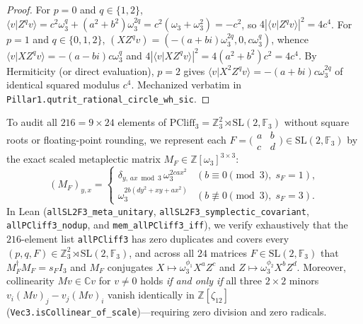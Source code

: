 \documentclass[11pt,letterpaper]{article}
\theoremstyle{plain}
\theoremstyle{definition}
\theoremstyle{remark}
\newcommand{\F}{\mathbb{F}}
\newcommand{\Z}{\mathbb{Z}}
\newcommand{\C}{\mathbb{C}}
\newcommand{\PCliff}{\mathrm{PCliff}}
\newcommand{\SL}{\mathrm{SL}}
\newcommand{\braket}[2]{\langle #1 \vert #2 \rangle}
\newcommand{\leanref}[1]{\textnormal{\texttt{\footnotesize #1}}}
\begin{document}
\begin{proof}
For $p=0$ and $q\in\{1,2\}$, $\braket{v}{Z^q v}=c^2\omega_3^q+(a^2+b^2)\omega_3^{2q}=c^2(\omega_3+\omega_3^2)=-c^2$, so $4|\braket{v}{Z^q v}|^2=4c^4$. For $p=1$ and $q\in\{0,1,2\}$, $(X Z^q v)=(-(a+bi)\omega_3^{2q},0,c\omega_3^q)$, whence $\braket{v}{X Z^q v}=-(a-bi)c\omega_3^q$ and $4|\braket{v}{X Z^q v}|^2=4(a^2+b^2)c^2=4c^4$. By Hermiticity (or direct evaluation), $p=2$ gives $\braket{v}{X^2 Z^q v}=-(a+bi)c\omega_3^{2q}$ of identical squared modulus $c^4$. Mechanized verbatim in \leanref{Pillar1.qutrit\_rational\_circle\_wh\_sic}.
\end{proof}

To audit all $216=9\times 24$ elements of $\PCliff_3=\Z_3^2\rtimes\SL(2,\F_3)$ without square roots or floating-point rounding, we represent each $F=\bigl(\begin{smallmatrix}a & b\\ c & d\end{smallmatrix}\bigr)\in\SL(2,\F_3)$ by the exact scaled metaplectic matrix $M_F\in\Z[\omega_3]^{3\times 3}$:
\begin{equation}
\label{eq:meta-entry}
  (M_F)_{y,x} =
  \begin{cases}
    \delta_{y,\,ax\bmod 3}\,\omega_3^{2cax^2} & (b\equiv 0\pmod 3,\; s_F=1), \\
    \omega_3^{2b(dy^2+xy+ax^2)} & (b\not\equiv 0\pmod 3,\; s_F=3).
  \end{cases}
\end{equation}
In Lean (\leanref{allSL2F3\_\allowbreak meta\_\allowbreak unitary}, \leanref{allSL2F3\_\allowbreak symplectic\_\allowbreak covariant}, \leanref{allPCliff3\_\allowbreak nodup}, and \leanref{mem\_\allowbreak allPCliff3\_\allowbreak iff}), we verify exhaustively that the $216$-element list \leanref{allPCliff3} has zero duplicates and covers every $(p,q,F)\in\Z_3^2\rtimes\SL(2,\F_3)$, and across all $24$ matrices $F\in\SL(2,\F_3)$ that $M_F^\dagger M_F = s_F I_3$ and $M_F$ conjugates $X\mapsto \omega_3^{\phi_1}X^a Z^c$ and $Z\mapsto \omega_3^{\phi_2}X^b Z^d$. Moreover, collinearity $M v \in \C v$ for $v\neq 0$ holds \emph{if and only if} all three $2\times 2$ minors $v_i(Mv)_j - v_j(Mv)_i$ vanish identically in $\Z[\zeta_{12}]$ (\leanref{Vec3.\allowbreak isCollinear\_\allowbreak of\_\allowbreak scale})---requiring zero division and zero radicals.
\end{document}
